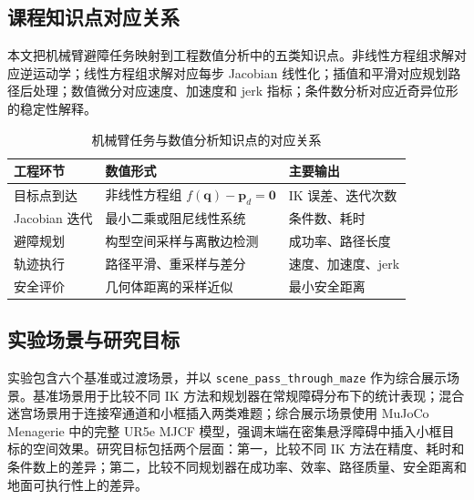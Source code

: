 \documentclass[UTF8,zihao=-4]{ctexart}
\begin{document}
\subsection{课程知识点对应关系}
本文把机械臂避障任务映射到工程数值分析中的五类知识点。非线性方程组求解对应逆运动学；线性方程组求解对应每步 Jacobian 线性化；插值和平滑对应规划路径后处理；数值微分对应速度、加速度和 jerk 指标；条件数分析对应近奇异位形的稳定性解释。

\begin{table}[!htbp]
  \centering
  \caption{机械臂任务与数值分析知识点的对应关系}
  \label{tab:course-map}
  \begin{tabularx}{\textwidth}{p{3.6cm}X p{3.2cm}}
    \toprule
    工程环节 & 数值形式 & 主要输出 \\
    \midrule
    目标点到达 & 非线性方程组 $f(\bm q)-\bm p_d=\bm 0$ & IK 误差、迭代次数 \\
    Jacobian 迭代 & 最小二乘或阻尼线性系统 & 条件数、耗时 \\
    避障规划 & 构型空间采样与离散边检测 & 成功率、路径长度 \\
    轨迹执行 & 路径平滑、重采样与差分 & 速度、加速度、jerk \\
    安全评价 & 几何体距离的采样近似 & 最小安全距离 \\
    \bottomrule
  \end{tabularx}
\end{table}

\subsection{实验场景与研究目标}
实验包含六个基准或过渡场景，并以 \texttt{scene\_pass\_through\_maze} 作为综合展示场景。基准场景用于比较不同 IK 方法和规划器在常规障碍分布下的统计表现；混合迷宫场景用于连接窄通道和小框插入两类难题；综合展示场景使用 MuJoCo Menagerie 中的完整 UR5e MJCF 模型，强调末端在密集悬浮障碍中插入小框目标的空间效果。研究目标包括两个层面：第一，比较不同 IK 方法在精度、耗时和条件数上的差异；第二，比较不同规划器在成功率、效率、路径质量、安全距离和地面可执行性上的差异。
\end{document}
